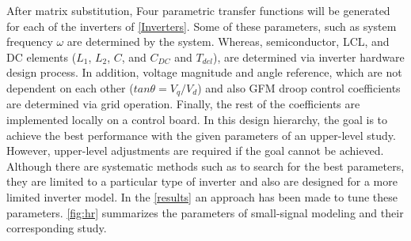 After matrix substitution, Four parametric transfer functions will be generated for each of the inverters of \ref{Inverters}. Some of these parameters, such as system frequency $\omega$ are determined by the system. Whereas, semiconductor, LCL, and DC elements ($L_1$, $L_2$, $C$, and $C_{DC}$ and $T_{del}$), are determined via inverter hardware design process. In addition, voltage magnitude and angle reference, which are not dependent on each other ($tan\theta=V_q/V_d$) and also \gls{GFM} droop control coefficients are determined via grid operation. Finally, the rest of the coefficients are implemented locally on a control board. In this design hierarchy, the goal is to achieve the best performance with the given parameters of an upper-level study. However, upper-level adjustments are required if the goal cannot be achieved. Although there are systematic methods such as \cite{ParamTune} to search for the best parameters, they are limited to a particular type of inverter and also are designed for a more limited inverter model. In the \ref{results} an approach has been made to tune these parameters. \ref{fig:hr} summarizes the parameters of small-signal modeling and their corresponding study.